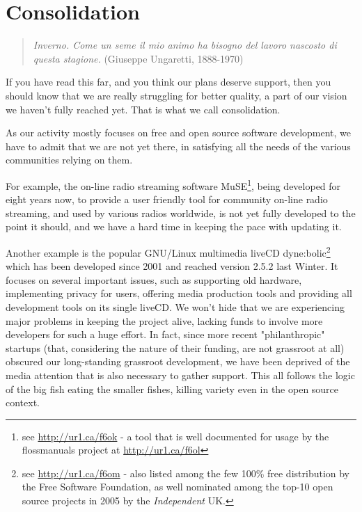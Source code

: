\section{Consolidation}
\label{s:weaver_birds:consolidation}

\begin{quote}
\textit{Inverno. Come un seme il mio animo ha bisogno del lavoro nascosto di
questa stagione.} (Giuseppe Ungaretti, 1888-1970)
\end{quote}

If you have read this far, and you think our plans deserve support, then you
should know that we are really struggling for better quality, a part of our
vision we haven't fully reached yet. That is what we call consolidation.

As our activity mostly focuses on free and open source software development, we
have to admit that we are not yet there, in satisfying all the needs of the
various communities relying on them.

For example, the on-line radio streaming software MuSE\footnote{see
\url{http://ur1.ca/f6ok} - a tool that is well documented for usage by the
f\hbox{}lossmanuals project at \url{http://ur1.ca/f6ol}}, being developed for
eight years now, to provide a user friendly tool for community on-line radio
streaming, and used by various radios worldwide, is not yet fully developed to
the point it should, and we have a hard time in keeping the pace with updating
it.

Another example is the popular GNU/Linux multimedia liveCD
dyne:bolic\footnote{see \url{http://ur1.ca/f6om} - also listed among the few
100\% free distribution by the Free Software Foundation, as well nominated among
the top-10 open source projects in 2005 by the \textit{Independent} UK.} which
has been developed since 2001 and reached version 2.5.2 last Winter. It focuses
on several important issues, such as supporting old hardware, implementing
privacy for users, of\hbox{}fering media production tools and providing all
development tools on its single liveCD. We won't hide that we are experiencing
major problems in keeping the project alive, lacking funds to involve more
developers for such a huge ef\hbox{}fort. In fact, since more recent
"philanthropic" startups (that, considering the nature of their funding, are not
grassroot at all) obscured our long-standing grassroot development, we have been
deprived of the media attention that is also necessary to gather support. This
all follows the logic of the big f\hbox{}ish eating the smaller f\hbox{}ishes,
killing variety even in the open source context.

